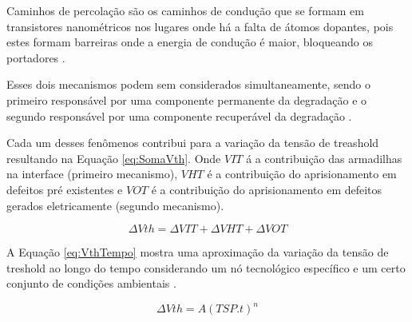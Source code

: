 


Caminhos de percolação são os caminhos de condução que se formam em transistores nanométricos nos lugares onde há a falta de átomos dopantes, pois estes formam barreiras onde a energia de condução é maior, bloqueando os portadores \cite{Banaszeski}.


Esses dois mecanismos podem sem considerados simultaneamente, sendo o primeiro responsável por uma componente permanente da degradação e o segundo responsável por uma componente recuperável da degradação \cite{Banaszeski}.

Cada um desses fenômenos contribui para a variação da tensão de treashold resultando na Equação \ref{eq:SomaVth}. Onde $V\scriptstyle{IT}$ á a contribuição das armadilhas na interface (primeiro mecanismo), $V\scriptstyle{HT}$ é a contribuição do aprisionamento em defeitos pré existentes e $V\scriptstyle{OT}$ é a contribuição do aprisionamento em defeitos gerados eletricamente (segundo mecanismo).

\begin{equation}
    \label{eq:SomaVth}
    \Delta V{\scriptstyle {th}} = \Delta V{\scriptstyle {IT}} + \Delta V{\scriptstyle {HT}} + \Delta V{\scriptstyle {OT}}
\end{equation}

A Equação \ref{eq:VthTempo} mostra uma aproximação da variação da tensão de treshold ao longo do tempo considerando um nó tecnológico específico e um certo conjunto de condições ambientais \cite{Butzen}.

\begin{equation}
    \label{eq:VthTempo}
    \Delta Vth = A(TSP.t)^n
\end{equation}

